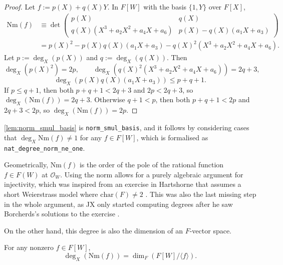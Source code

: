 \documentclass[a4paper,UKenglish,cleveref,autoref,thm-restate]{lipics-v2021}
\begin{document}
\begin{proof}
Let $ f := p(X) + q(X)Y $. In $ F[W] $ with the basis $ \{1, Y\} $ over $ F[X] $,
\begin{align*}
\mathrm{Nm}(f)
& \equiv \det\begin{pmatrix} p(X) & q(X) \\ q(X)(X^3 + a_2X^2 + a_4X + a_6) & p(X) - q(X)(a_1X + a_3) \end{pmatrix} \\
& = p(X)^2 - p(X)q(X)(a_1X + a_3) - q(X)^2(X^3 + a_2X^2 + a_4X + a_6).
\end{align*}
Let $ p := \deg_X(p(X)) $ and $ q := \deg_X(q(X)) $. Then
\[ \deg_X(p(X)^2) = 2p, \qquad \deg_X(q(X)^2(X^3 + a_2X^2 + a_4X + a_6)) = 2q + 3, \]
\[ \deg_X(p(X)q(X)(a_1X + a_3)) \le p + q + 1. \]
If $ p \le q + 1 $, then both $ p + q + 1 < 2q + 3 $ and $ 2p < 2q + 3 $, so $ \deg_X(\mathrm{Nm}(f)) = 2q + 3 $. Otherwise $ q + 1 < p $, then both $ p + q + 1 < 2p $ and $ 2q + 3 < 2p $, so $ \deg_X(\mathrm{Nm}(f)) = 2p $.
\end{proof}

\cref{lem:norm_smul_basis} is \texttt{norm\_smul\_basis}, and it follows by considering cases that $ \deg_X \mathrm{Nm}(f) \ne 1 $ for any $ f \in F[W] $, which is formalised as \texttt{nat\_degree\_norm\_ne\_one}.

\begin{remark}
Geometrically, $ \mathrm{Nm}(f) $ is the order of the pole of the rational function $ f \in F(W) $ at $ \mathcal{O}_W $. Using the norm allows for a purely algebraic argument for injectivity, which was inspired from an exercise in Hartshorne that assumes a short Weierstrass model where $ \mathrm{char}(F) \ne 2 $ \cite[Exercise I.6.2]{hartshorne}. This was also the last missing step in the whole argument, as JX only started computing degrees after he saw Borcherds's solutions to the exercise \cite{borcherds}.
\end{remark}

On the other hand, this degree is also the dimension of an $ F $-vector space.

\pagebreak

\begin{lemma}
\label{lem:finrank_quotient_span_eq_nat_degree_norm}
For any nonzero $ f \in F[W] $,
\[ \deg_X(\mathrm{Nm}(f)) = \dim_F(F[W] / \langle f \rangle). \]
\end{lemma}
\end{document}
